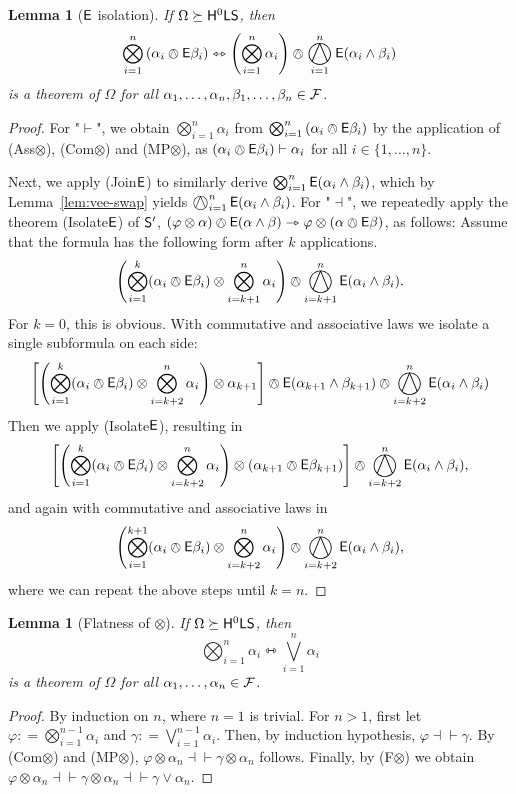 \documentclass[a4paper,english,fleqn,11pt,final]{scrartcl}
\newcommand{\logicOpFont}[1]{\mathsf{#1}}
\newcommand{\E}{\protect\ensuremath\logicOpFont{E}}
\newcommand{\calF}{\protect\ensuremath{\mathcal{F}}}
\newcommand{\sfS}{\protect\ensuremath{\mathsf{S}}}
\newcommand{\sfH}{\protect\ensuremath{\mathsf{H}}}
\newcommand{\sfL}{\protect\ensuremath{\mathsf{L}}}
\providecommand{\dfn}{\mathrel{\mathop:}=}
\newcommand{\timp}{\rightarrowtriangle}
\newcommand{\tequiv}{\leftrightarrowtriangle}
\newcommand{\eqpr}{\dashv\vdash}
\newcommand{\tens}{\otimes}
\newcommand{\Deriv}[1]{{\normalfont\textsf{#1}}}
\newcommand{\oland}{\owedge}
\DeclareMathOperator*{\bigoland}{\scalerel*{\owedge}{\sum}}
\DeclareMathOperator*{\bigtens}{\bigotimes}
\theoremstyle{plain}
\newtheorem{lemma}[theorem]{Lemma}
\theoremstyle{definition}
\begin{document}
\begin{lemma}[$\E$ isolation]\label{lem:isolate-alpha}
If $\Omega\succeq \sfH^0\sfL\sfS$, then
\[
\bigtens_{i=1}^n \left( \alpha_i \oland \E \beta_i\right) \tequiv \left(\bigtens_{i=1}^n \alpha_i\right) \oland \bigoland_{i=1}^n \E (\alpha_i \land \beta_i)
\] is a theorem of $\Omega$ for all $\alpha_1,\ldots,\alpha_n,\beta_1,\ldots,\beta_n \in \calF$.
\end{lemma}
\begin{proof}
For "$\vdash$", we obtain $\bigtens_{i=1}^n \alpha_i$ from $\bigtens_{i=1}^n \left( \alpha_i \oland \E \beta_i\right)$ by the application of \Deriv{(Ass$\tens$)}, \Deriv{(Com$\tens$)} and \Deriv{(MP$\tens$)}, as $(\alpha_i\oland\E\beta_i) \vdash\alpha_i$ for all $i \in \{1, \ldots, n\}$.

Next, we apply \Deriv{(Join$\E$)} to similarly derive $\bigtens_{i=1}^n \E(\alpha_i \land \beta_i)$, which by Lemma~\ref{lem:vee-swap} yields $\bigoland_{i=1}^n \E(\alpha_i \land \beta_i)$.
For "$\dashv$", we repeatedly apply the theorem \Deriv{(Isolate$\E$)} of $\sfS'$, $(\varphi \tens \alpha) \oland \E(\alpha \land \beta) \timp \varphi \tens (\alpha \oland \E \beta)$, as follows:
Assume that the formula has the following form after $k$ applications.
\[
\left(\bigtens_{i=1}^k(\alpha_i \oland \E\beta_i) \tens \bigtens_{i=k+1}^{n} \alpha_i\right)\oland \bigoland_{i=k+1}^{n}\E(\alpha_i \land \beta_i)\text{.}
\]
For $k = 0$, this is obvious. With commutative and associative laws we isolate a single subformula on each side:
\[
\left[\left(\bigtens_{i=1}^k(\alpha_i \oland \E\beta_i)  \tens \bigtens_{i=k+2}^{n} \alpha_i\right) \tens \alpha_{k+1}\right]\oland  \E(\alpha_{k+1}\land \beta_{k+1})\oland\bigoland_{i=k+2}^{n}\E(\alpha_i \land \beta_i)
\]
Then we apply \Deriv{(Isolate$\E$)}, resulting in
\[
\left[\left(\bigtens_{i=1}^k(\alpha_i \oland \E\beta_i)  \tens \bigtens_{i=k+2}^{n} \alpha_i\right)\tens  (\alpha_{k+1}\oland\E \beta_{k+1})\right]\oland\bigoland_{i=k+2}^{n}\E(\alpha_i \land \beta_i)\text{,}
\]
and again with commutative and associative laws in
\[
\left(\bigtens_{i=1}^{k+1}(\alpha_i \oland \E\beta_i)  \tens \bigtens_{i=k+2}^{n} \alpha_i\right)\oland\bigoland_{i=k+2}^{n}\E(\alpha_i \land \beta_i)\text{,}
\]
where we can repeat the above steps until $k = n$.
\end{proof}


\begin{lemma}[Flatness of $\tens$]\label{lem:flatness-transform}
If $\Omega \succeq \sfH^0\sfL\sfS$, then
\[
\bigtens_{i=1}^n\alpha_i \tequiv \bigvee_{i=1}^n \alpha_i
\]
is a theorem of $\Omega$ for all $\alpha_1, \ldots,\alpha_n \in \calF$.
\end{lemma}
\begin{proof}
By induction on $n$, where $n = 1$ is trivial.
For $n > 1$, first let $\varphi \dfn \bigtens_{i=1}^{n-1}\alpha_i$ and $\gamma\dfn \bigvee_{i=1}^{n-1} \alpha_i$.
Then, by induction hypothesis, $\varphi \eqpr \gamma$.
By \Deriv{(Com$\tens$)} and \Deriv{(MP$\tens$)}, $\varphi\tens\alpha_n \eqpr \gamma\tens \alpha_n$ follows.
Finally, by \Deriv{(F$\tens$)} we obtain $\varphi \tens \alpha_n \eqpr \gamma\tens \alpha_n \eqpr \gamma\lor \alpha_n$.
\end{proof}
\end{document}
